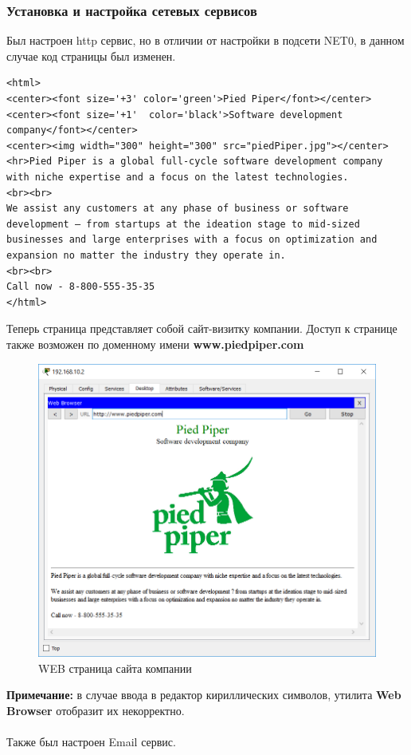 \subsubsection{Установка и настройка сетевых сервисов}
Был настроен http сервис, но в отличии от настройки в подсети NET0, в данном случае код страницы был изменен.
\begin{lstlisting}[language={}, caption={index.html}]
<html>
<center><font size='+3' color='green'>Pied Piper</font></center>
<center><font size='+1'  color='black'>Software development company</font></center>
<center><img width="300" height="300" src="piedPiper.jpg"></center>
<hr>Pied Piper is a global full-cycle software development company with niche expertise and a focus on the latest technologies. 
<br><br>
We assist any customers at any phase of business or software development — from startups at the ideation stage to mid-sized businesses and large enterprises with a focus on optimization and expansion no matter the industry they operate in.
<br><br>
Call now - 8-800-555-35-35
</html>
\end{lstlisting}
Теперь страница представляет собой сайт-визитку компании. Доступ к странице также возможен по доменному имени \textbf{www.piedpiper.com}
\begin{figure}[H]
  \centering
  \includegraphics[width=.8\textwidth]{img/net1_10_2__0}
  \caption{WEB страница сайта компании}
\end{figure}
\textbf{Примечание:} в случае ввода в редактор кириллических символов, утилита \textbf{Web Browser} отобразит их некорректно.\\\\
Также был настроен Email сервис.

